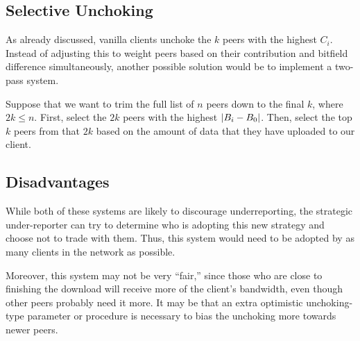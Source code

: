 \subsection{Selective Unchoking}

As already discussed, vanilla clients unchoke the $k$ peers with the highest $C_i$. Instead of adjusting this to weight peers based on their contribution and bitfield difference simultaneously, another possible solution would be to implement a two-pass system.

Suppose that we want to trim the full list of $n$ peers down to the final $k$, where $2k \leq n$. First, select the $2k$ peers with the highest $\lvert B_i - B_0\rvert$. Then, select the top $k$ peers from that $2k$ based on the amount of data that they have uploaded to our client.

\subsection{Disadvantages}
While both of these systems are likely to discourage underreporting, the strategic under-reporter can try to determine who is adopting this new strategy and choose not to trade with them. Thus, this system would need to be adopted by as many clients in the network as possible.

Moreover, this system may not be very ``fair,'' since those who are close to finishing the download will receive more of the client's bandwidth, even though other peers probably need it more. It may be that an extra optimistic unchoking-type parameter or procedure is necessary to bias the unchoking more towards newer peers.
